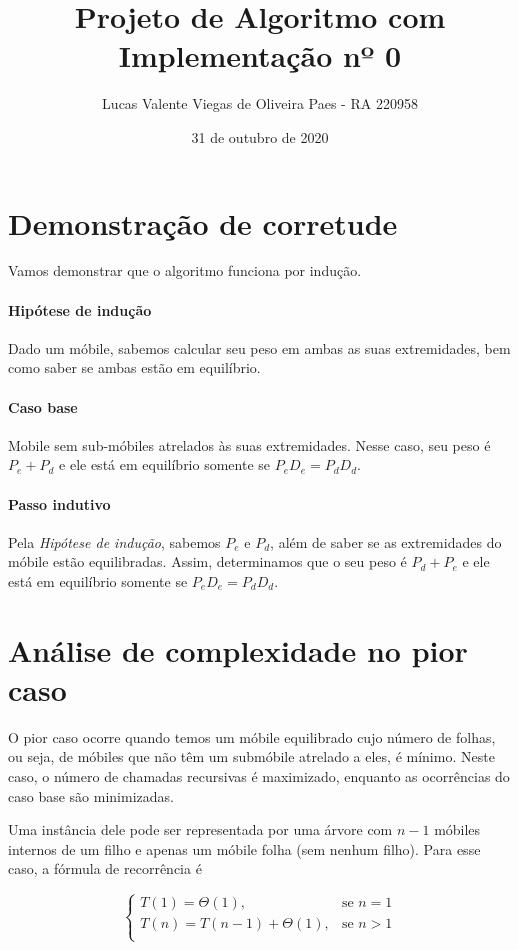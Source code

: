 \documentclass[12pt,a4paper]{article}
\title{Projeto de Algoritmo com Implementação nº 0}
\date{31 de outubro de 2020}
\author{Lucas Valente Viegas de Oliveira Paes - RA 220958}
\begin{document}
  \maketitle

  \section{Demonstração de corretude}
  Vamos demonstrar que o algoritmo funciona por indução.
  \paragraph{Hipótese de indução}
  Dado um móbile, sabemos calcular seu peso em ambas as suas extremidades, bem como saber se ambas estão em equilíbrio.
  \paragraph{Caso base} Mobile sem sub-móbiles atrelados às suas extremidades. Nesse caso, seu peso é $P_e + P_d$ e ele está em equilíbrio somente se $P_eD_e = P_dD_d$.
  \paragraph{Passo indutivo} Pela \emph{Hipótese de indução}, sabemos $P_e$ e $P_d$, além de saber se as extremidades do móbile estão equilibradas. Assim, determinamos que o seu peso é $P_{d} + P_{e}$ e ele está em equilíbrio somente se $P_eD_e = P_dD_d$.

  \section{Análise de complexidade no pior caso}
  O pior caso ocorre quando temos um móbile equilibrado cujo número de folhas, ou seja, de móbiles que não têm um submóbile atrelado a eles, é mínimo. Neste caso, o número de chamadas recursivas é maximizado, enquanto as ocorrências do caso base são minimizadas. 
  
  Uma instância dele pode ser representada por uma árvore com $n-1$ móbiles internos de um filho e apenas um móbile folha (sem nenhum filho). Para esse caso, a fórmula de recorrência é

  \begin{equation}\label{recorrencia}
    \begin{cases}
      T(1) = \Theta(1),& \text{se } n = 1\\
      T(n) = T(n-1) + \Theta(1),& \text{se } n > 1\\
    \end{cases}
  \end{equation}
\end{document}
